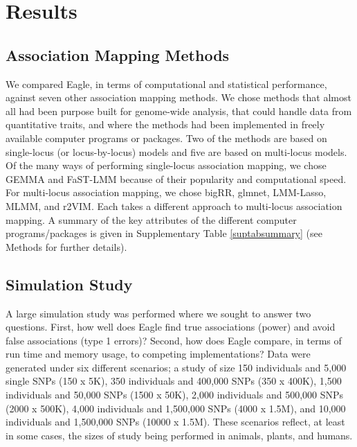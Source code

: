 \documentclass{article}
\begin{document}
  
  

\section{Results}

\subsection{Association Mapping Methods}

We compared Eagle, in terms of computational and statistical performance, against seven other association mapping methods. 
We chose methods that almost all had been purpose built for genome-wide analysis, that could handle data from quantitative traits, and where the methods had been implemented in freely available computer programs or packages. Two of the methods are based on single-locus (or locus-by-locus) models and five are based on multi-locus models. Of the many ways of performing single-locus association mapping, we chose 
GEMMA and FaST-LMM  because of their popularity and computational speed. 
For multi-locus association mapping, we chose bigRR, glmnet, 
LMM-Lasso, MLMM, and r2VIM.  
Each takes a different approach to multi-locus association mapping. A summary of the key attributes of the different computer programs/packages 
is given in Supplementary Table \ref{suptabsummary} (see Methods for further details). 

 

\subsection{Simulation Study}
A large simulation study was performed where we sought to  answer two questions. 
First, how well does Eagle find true associations (power) and avoid 
false associations (type 1 errors)? Second, how does Eagle compare, in terms of run time and memory usage, to 
competing implementations? Data were generated under six different scenarios; a study of size 150 individuals 
and 5,000 single SNPs (150 x 5K),  350 individuals and 400,000 SNPs (350 x 400K),  1,500 individuals and 
50,000 SNPs (1500 x 50K), 2,000 individuals and 500,000 SNPs (2000 x 500K), 4,000 individuals and 
1,500,000 SNPs (4000 x 1.5M), and 10,000 individuals and 1,500,000 SNPs (10000 x 1.5M).   
These scenarios reflect, at least in some cases, the sizes of study being performed in animals, plants, and humans.  
\end{document}

